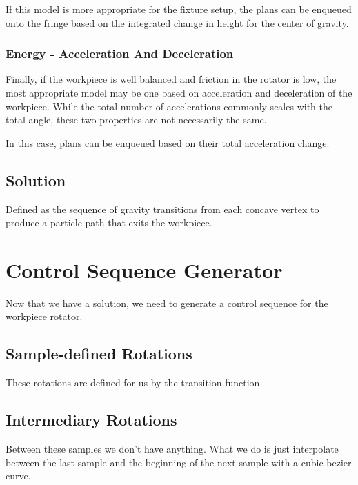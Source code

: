 
If this model is more appropriate for the fixture setup, the plans can be enqueued onto the fringe based on the integrated change in height for the center of gravity.

		\subsubsection{Energy - Acceleration And Deceleration}

Finally, if the workpiece is well balanced and friction in the rotator is low, the most appropriate model may be one based on acceleration and deceleration of the workpiece. While the total number of accelerations commonly scales with the total angle, these two properties are not necessarily the same.

In this case, plans can be enqueued based on their total acceleration change.


	\subsection{Solution}

		Defined as the sequence of gravity transitions from each concave vertex to produce a particle path that exits the workpiece.

\section{Control Sequence Generator}

Now that we have a solution, we need to generate a control sequence for the workpiece rotator.

	\subsection{Sample-defined Rotations}

These rotations are defined for us by the transition function.

	\subsection{Intermediary Rotations}

Between these samples we don't have anything. What we do is just interpolate between the last sample and the beginning of the next sample with a cubic bezier curve.

